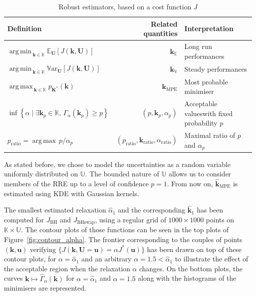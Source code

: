 \documentclass[preprint, 1p]{elsarticle}
\DeclareMathOperator*{\argmin}{arg\,min \,}
\DeclareMathOperator*{\argmax}{arg\,max \,}
\newcommand{\Var}{\mathbb{V}\textrm{ar}}
\newcommand{\Ex}{\mathbb{E}}
\newcommand{\kmean}{{\mathbf{k}}_{\Ex}}
\newcommand{\kvar}{{\mathbf{k}}_{\mathbb{V}}}
\newcommand{\kmpe}{{\mathbf{k}}_{\mathrm{MPE}}}
\newcommand{\hatkmpe}{\hat{\mathbf{k}}_{\mathrm{MPE}}}
\newcommand{\RRE}{RRE}
\newcommand{\checkap}{{\alpha}_p}
\newcommand{\checka}{{\alpha}}
\newcommand{\checkk}{\mathbf{k}}
\newcommand{\checkkp}{{\mathbf{k}}_p}
\newcommand{\Kspace}{\mathbb{K}}
\newcommand{\Uspace}{\mathbb{U}}
\newcommand{\JBH}{J_{\mathrm{BH}}}
\newcommand{\JBHS}{J_{\mathrm{BHswap}}}
\begin{document}
\begin{table}[!h]
  \centering
\begin{tabular}{lrp{5cm}}
  \toprule
  Definition & Related quantities & Interpretation \\ \midrule
   $\argmin_{\mathbf{k}\in\Kspace} \Ex_{\mathbf{U}}\left[J(\mathbf{k},\mathbf{U})\right]$& $\kmean$ & Long run performances\\
   $\argmin_{\mathbf{k}\in\Kspace} \Var_{\mathbf{U}}\left[J(\mathbf{k},\mathbf{U})\right]$& $\kvar$  & Steady performances\\
   $\argmax_{\mathbf{k}\in\Kspace} p_{\mathbf{K}^*}(\mathbf{k})$ & $\kmpe$ & Most probable minimiser\\
    $\inf\left\{ \alpha \mid \exists \checkkp \in \Kspace,\, \Gamma_{\alpha}(\checkkp) \geq p \right\}$ & $(p, \checkkp,\checkap)$ & Acceptable values\newline with fixed probability $p$ \\
    $p_{\mathrm{ratio}} = \argmax p/\checkap$ & $(p_{\mathrm{ratio}}, \checkk_{\mathrm{ratio}}, \checka_{\mathrm{ratio}})$ & Maximal ratio of $p$ and $\checkap$ \\
  \bottomrule
\end{tabular}
\caption{Robust estimators, based on a cost function $J$}
\label{tab:RO_recap}
\end{table}


As stated before, we chose to model the uncertainties as a random variable uniformly distributed on $\Uspace$. The bounded nature of $\Uspace$ allows us to consider members of the \RRE{} up to a level of confidence $p=1$.
From now on, $\hatkmpe$ is estimated using KDE with Gaussian kernels.


The smallest estimated relaxation $\hat{\checka}_1$ and the corresponding $\hat{\checkk}_1$ has been computed for $\JBH$ and $\JBHS$, using a regular grid of $1000 \times 1000$ points on $\Kspace\times\Uspace$. The contour plots of those functions can be seen in the top plots of Figure~\ref{fig:contour_alpha}. The frontier corresponding to the couples of points $(\mathbf{k},\mathbf{u})$ verifying $\{J(\mathbf{k},\mathbf{U}=\mathbf{u}) = \alpha J^*(\mathbf{u})\}$ has been drawn on top of these contour plots, for $\alpha=\hat{\checka}_1$ and an arbitrary $\alpha=1.5<\hat{\checka}_1$ to illustrate the effect of the acceptable region when the relaxation $\alpha$ changes. 
On the bottom plots, the curves $\mathbf{k}\mapsto \hat{\Gamma}_{\alpha}(\mathbf{k})$ for $\alpha=\hat{\checka}_1$ and $\alpha=1.5$ along with the histograms of the minimisers are represented.
\end{document}
